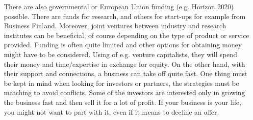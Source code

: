 \documentclass[english,12pt,a4paper,pdftex,elec,utf8]{aaltothesis}
\begin{document}
	There are also governmental or European Union funding (e.g. Horizon 2020) possible. There are funds for research, and others for start-ups for example from Business Finland. Moreover, joint ventures between industry and research institutes can be beneficial, of course depending on the type of product or service provided. Funding is often quite limited and other options for obtaining money might have to be considered. Using of e.g. venture capitalists, they will spend their money and time/expertise in exchange for equity. On the other hand, with their support and connections, a business can take off quite fast. One thing must be kept in mind when looking for investors or partners, the strategies must be matching to avoid conflicts. Some of the investors are interested only in growing the business fast and then sell it for a lot of profit. If your business is your life, you might not want to part with it, even if it means to decline an offer.  
\end{document}
